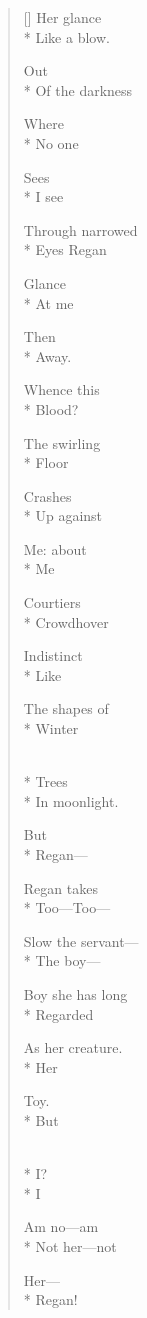\label{ch:lear_ar}
\begin{verse}[\versewidth]
\qquad Her glance\\*
Like a blow.

\qquad \qquad Out\\*
Of the darkness

Where\\*
No one

Sees\\*
I see

Through narrowed\\*
Eyes Regan

Glance\\*
At me

\qquad \qquad Then\\*
Away.

\hspace*{3\vgap} Whence this\\*
Blood?

The swirling\\*
Floor

Crashes\\*
Up against

Me: about\\*
Me

Courtiers\\*
Crowd\qquad \qquad hover

Indistinct\\*
\qquad \qquad Like

The shapes of\\*
Winter

\\*
Trees\\*
In moonlight.

\qquad \qquad But\\*
Regan---

Regan takes\\*
Too---Too---

Slow the servant---\\*
The boy---

Boy she has long\\*
Regarded

As her creature.\\*
Her

Toy.\\*
But

\\*
I?\\*
I

Am no---am\\*
Not her---not

Her---\\*
\qquad Regan!
\end{verse}
